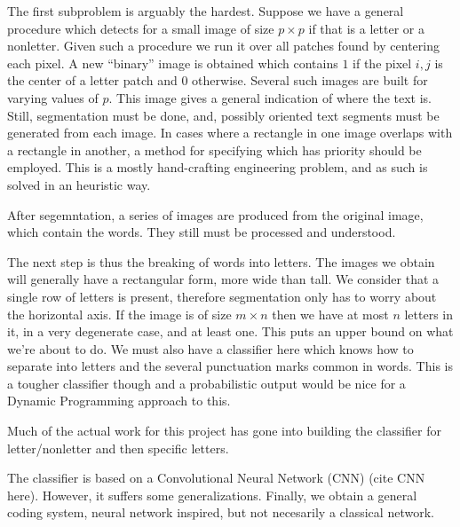 \documentclass[12pt,a4paper,oneside,english]{UPBThesis}
\newcommand{\hctimes}[2]{{#1}\!\times\!{#2}}
\begin{document}
The first subproblem is arguably the hardest. Suppose we have a general procedure which detects for a small image of size $\hctimes{p}{p}$ if that is a letter or a nonletter. Given such a procedure we run it over all patches found by centering each pixel. A new ``binary'' image is obtained which contains $1$ if the pixel $i,j$ is the center of a letter patch and $0$ otherwise. Several such images are built for varying values of $p$. This image gives a general indication of where the text is. Still, segmentation must be done, and, possibly oriented text segments must be generated from each image. In cases where a rectangle in one image overlaps with a rectangle in another, a method for specifying which has priority should be employed. This is a mostly hand-crafting engineering problem, and as such is solved in an heuristic way.

After segemntation, a series of images are produced from the original image, which contain the words. They still must be processed and understood.

The next step is thus the breaking of words into letters. The images we obtain will generally have a rectangular form, more wide than tall. We consider that a single row of letters is present, therefore segmentation only has to worry about the horizontal axis. If the image is of size $\hctimes{m}{n}$ then we have at most $n$ letters in it, in a very degenerate case, and at least one. This puts an upper bound on what we're about to do. We must also have a classifier here which knows how to separate into letters and the several punctuation marks common in words. This is a tougher classifier though and a probabilistic output would be nice for a Dynamic Programming approach to this.

Much of the actual work for this project has gone into building the classifier for letter/nonletter and then specific letters.

The classifier is based on a Convolutional Neural Network (CNN) (cite CNN here). However, it suffers some generalizations. Finally, we obtain a general coding system, neural network inspired, but not necesarily a classical network.
\end{document}
